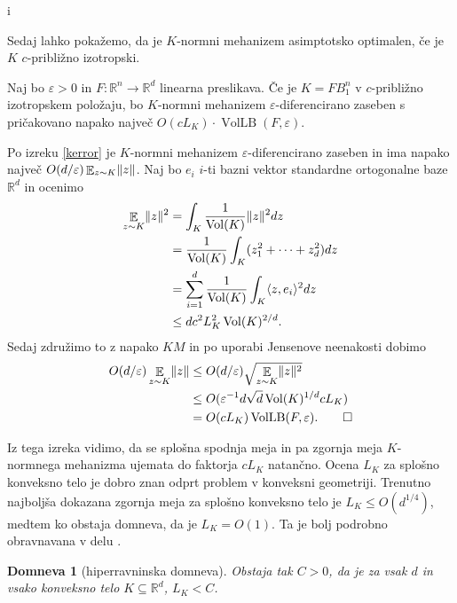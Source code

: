 i\documentclass[mat1]{fmfdelo}
\newtheorem{domneva}[definicija]{Domneva}
\DeclarePairedDelimiter{\norm}{\lVert}{\rVert}
\newcommand{\R}{\mathbb R}
\DeclareMathOperator*{\E}{\mathbb E}
\DeclareMathOperator{\Vol}{Vol}
\newcommand{\query}{F: \R^n \to \R^d}
\begin{document}
Sedaj lahko pokažemo, da je $K$-normni mehanizem asimptotsko optimalen, če je $K$ $c$-približno izotropski.

\begin{izrek}
    Naj bo $\varepsilon>0$ in $\query$ linearna preslikava. Če je $K=FB_1^n$ v $c$-približno izotropskem položaju, bo $K$-normni mehanizem $\varepsilon$-diferencirano zaseben s pričakovano napako največ $O(cL_K)\cdot \operatorname{VolLB}(F,\varepsilon)$.
\end{izrek}

\begin{dokaz}
    Po izreku \ref{kerror} je $K$-normni mehanizem $\varepsilon$-diferencirano zaseben in ima napako največ $O(d/\varepsilon) \E_{z\sim K} \norm{z}$.
    Naj bo $e_i$ $i$-ti bazni vektor standardne ortogonalne baze $\R^d$ in ocenimo
    \begin{align*}
        \E_{z\sim K} \norm{z}^2 &= \int_K \frac{1}{\Vol(K)} \norm{z}^2 dz \\
        &= \frac{1}{\Vol(K)} \int_K (z_1^2 + \dots + z_d^2) dz \\
        &= \sum_{i=1}^d \frac{1}{\Vol(K)} \int_K \langle z,e_i\rangle^2 dz \\
        &\leq d c^2 L_K^2 \Vol(K)^{2/d}.
    \end{align*}
    Sedaj združimo to z napako $KM$ in po uporabi Jensenove neenakosti dobimo
    \begin{align*}
        O(d/\varepsilon) \E_{z\sim K} \norm{z} &\leq O(d/\varepsilon) \sqrt{\E_{z\sim K} \norm{z}^2}  \\
        &\leq O(\varepsilon^{-1} d \sqrt{d} \Vol(K)^{1/d} c L_K) \\
        &= O(cL_K) \operatorname{VolLB}(F,\varepsilon). \qedhere
    \end{align*}
\end{dokaz}

Iz tega izreka vidimo, da se splošna spodnja meja in pa zgornja meja $K$-normnega mehanizma ujemata do faktorja $cL_K$ natančno. Ocena $L_K$ za splošno konveksno telo je dobro znan odprt problem v konveksni geometriji. Trenutno najboljša dokazana zgornja meja za splošno konveksno telo je $L_K \leq O(d^{1/4})$, medtem ko obstaja domneva, da je $L_K = O(1)$. Ta je bolj podrobno obravnavana v delu \cite{geomisotrop}. 

\begin{domneva}[hiperravninska domneva] Obstaja tak $C>0$,  da je za vsak $d$ in vsako konveksno telo $K \subseteq \R^d$, $L_K < C$.
\end{domneva}
\end{document}
